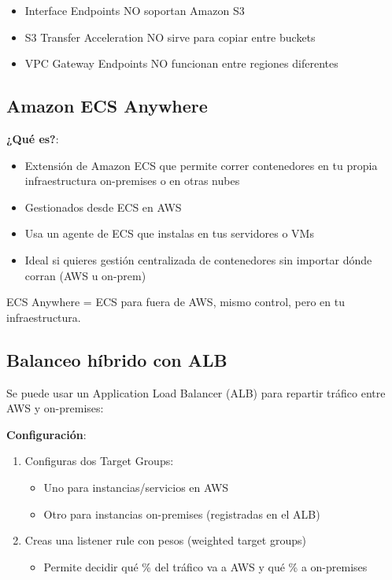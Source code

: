 \documentclass[12pt,a4paper]{report}
\begin{document}
\begin{warningbox}[Importante]
\begin{itemize}
    \item Interface Endpoints NO soportan Amazon S3
    \item S3 Transfer Acceleration NO sirve para copiar entre buckets
    \item VPC Gateway Endpoints NO funcionan entre regiones diferentes
\end{itemize}
\end{warningbox}

\subsection{Amazon ECS Anywhere}

\textbf{¿Qué es?}:
\begin{itemize}
    \item Extensión de Amazon ECS que permite correr contenedores en tu propia infraestructura on-premises o en otras nubes
    \item Gestionados desde ECS en AWS
    \item Usa un agente de ECS que instalas en tus servidores o VMs
    \item Ideal si quieres gestión centralizada de contenedores sin importar dónde corran (AWS u on-prem)
\end{itemize}

\begin{conceptbox}[Resumen]
ECS Anywhere = ECS para fuera de AWS, mismo control, pero en tu infraestructura.
\end{conceptbox}

\subsection{Balanceo híbrido con ALB}

Se puede usar un Application Load Balancer (ALB) para repartir tráfico entre AWS y on-premises:

\textbf{Configuración}:
\begin{enumerate}
    \item Configuras dos Target Groups:
    \begin{itemize}
        \item Uno para instancias/servicios en AWS
        \item Otro para instancias on-premises (registradas en el ALB)
    \end{itemize}
    
    \item Creas una listener rule con pesos (weighted target groups)
    \begin{itemize}
        \item Permite decidir qué \% del tráfico va a AWS y qué \% a on-premises
    \end{itemize}
\end{enumerate}
\end{document}
